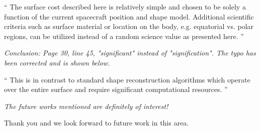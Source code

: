 \documentclass[11pt]{article}
\newenvironment{correction}{\begin{list}{}{\setlength{\leftmargin}{1cm}\setlength{\rightmargin}{1cm}}\vspace{\parsep}\item[]``}{''\end{list}}
\newcommand{\comment}[1]{\item \itshape #1 \normalfont}
\begin{document}
\begin{itemize}
\begin{correction}
    The surface cost described here is relatively simple and chosen to be solely a function of the current spacecraft position and shape model.
    Additional scientific criteria such as surface material or location on the body, e.g. equatorial vs. polar regions, can be utilized instead of a random science value as presented here.
\end{correction}

\comment{
Conclusion:
Page 30, line 45, "significant" instead of "signification".
}
The typo has been corrected and is shown below.

\begin{correction}
This is in contrast to standard shape reconstruction algorithms which operate over the entire surface and require significant computational resources.
\end{correction}

\comment{
The future works mentioned are definitely of interest!
}

Thank you and we look forward to future work in this area.

\end{itemize}
\end{document}
